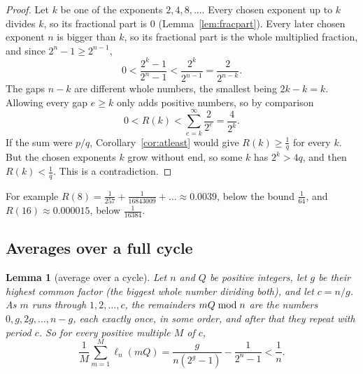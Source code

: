 \documentclass[10pt]{article}
\theoremstyle{plain}
\newtheorem{lemma}[theorem]{Lemma}
\theoremstyle{definition}
\theoremstyle{remark}
\newcommand{\lft}{\ell}
\newcommand{\rmod}{\mskip5mu\mathrm{mod}\mskip5mu}
\begin{document}
\begin{proof}
Let $k$ be one of the exponents $2,4,8,\dots$. Every chosen exponent up to $k$
divides $k$, so its fractional part is $0$ (Lemma~\ref{lem:fracpart}). Every later
chosen exponent $n$ is bigger than $k$, so its fractional part is the whole
multiplied fraction, and since $2^n-1\ge2^{n-1}$,
\[
 0<\frac{2^k-1}{2^n-1}<\frac{2^k}{2^{n-1}}=\frac2{2^{n-k}} .
\]
The gaps $n-k$ are different whole numbers, the smallest being $2k-k=k$.
Allowing every gap $e\ge k$ only adds positive numbers, so by comparison
\[
 0<R(k)<\sum_{e=k}^{\infty}\frac2{2^e}=\frac4{2^k}.
\]
If the sum were $p/q$, Corollary~\ref{cor:atleast} would give
$R(k)\ge\tfrac1q$ for every $k$. But the chosen exponents $k$ grow without
end, so some $k$ has $2^k>4q$, and then $R(k)<\tfrac1q$. This is a
contradiction.
\end{proof}

For example $R(8)=\tfrac1{257}+\tfrac1{16843009}+\dots\approx0.0039$, below the
bound $\tfrac1{64}$, and $R(16)\approx0.000015$, below $\tfrac1{16384}$.

\subsection{Averages over a full cycle}\label{app:cycle}

\begin{lemma}[average over a cycle]\label{lem:cycle}
Let $n$ and $Q$ be positive integers, let $g$ be their highest common factor
(the biggest whole number dividing both), and let $c=n/g$. As $m$ runs through
$1,2,\dots,c$, the remainders $mQ\rmod n$ are the numbers $0,g,2g,\dots,n-g$,
each exactly once, in some order, and after that they repeat with period $c$.
So for every positive multiple $M$ of $c$,
\[
 \frac1M\sum_{m=1}^{M}\lft_n(mQ)=\frac{g}{n(2^g-1)}-\frac1{2^n-1}<\frac1n .
\]
\end{lemma}
\end{document}
